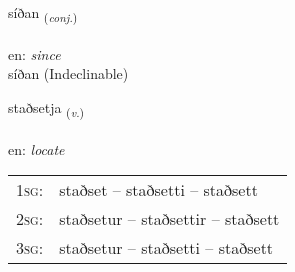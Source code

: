 \documentclass[frontgrid, backgrid]{flacards}\usepackage[]{graphicx}\usepackage[]{xcolor}
\begin{document}
\renewcommand{\flhead}{\vskip5pt \fboxsep=0pt {\small\bfseries\footnotesize Samtenging | Conjuction}}
\renewcommand{\fcfoot}{\vskip5pt \fboxsep=0pt \hspace{2pt}{\small\bfseries\footnotesize 3K}}

\renewcommand{\blhead}{\vskip5pt {\small\bfseries\footnotesize Samtenging | Conjuction }}
\renewcommand{\bcfoot}{\vskip5pt \hspace{2pt}{\small\bfseries\footnotesize 3K}}


{síðan \small{\textsubscript{(\textit{conj.})}} \\[1ex]
\textphonetic{[siːðan]} \\
en: \emph{since} \\  [2ex]
síðan (Indeclinable)}

\renewcommand{\flhead}{\vskip5pt \fboxsep=0pt {\small\bfseries\footnotesize Sagnorð | Verb}}
\renewcommand{\fcfoot}{\vskip5pt \fboxsep=0pt \hspace{2pt}{\small\bfseries\footnotesize 3K}}

\renewcommand{\blhead}{\vskip5pt {\small\bfseries\footnotesize Sagnorð | Verb }}
\renewcommand{\bcfoot}{\vskip5pt \hspace{2pt}{\small\bfseries\footnotesize 3K}}


{staðsetja \small{\textsubscript{(\textit{v.})}} \\[1ex] %
\textphonetic{[staðsɛtja]} \\
en: \emph{locate} \\  [2ex]
\renewcommand*{\arraystretch}{0.8}
\begin{tabular}{p{1cm}l}
\textsc{1sg}: & staðset -- staðsetti -- staðsett \\ 
\textsc{2sg}: & staðsetur -- staðsettir -- staðsett \\ 
\textsc{3sg}: & staðsetur -- staðsetti -- staðsett \\ 
\end{tabular}
}

\renewcommand{\flhead}{\vskip5pt \fboxsep=0pt {\small\bfseries\footnotesize Lýsingarorð | Adjective}}
\renewcommand{\fcfoot}{\vskip5pt \fboxsep=0pt \hspace{2pt}{\small\bfseries\footnotesize 3K}}
\end{document}
